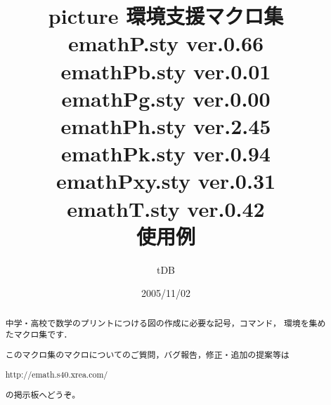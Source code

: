 \documentclass[a4j]{jarticle}
\begin{document}
\title{picture 環境支援マクロ集\\
emathP.sty {\normalsize ver.0.66}\\
emathPb.sty {\normalsize ver.0.01}\\
emathPg.sty {\normalsize ver.0.00}\\
emathPh.sty {\normalsize ver.2.45}\\
emathPk.sty {\normalsize ver.0.94}\\
emathPxy.sty {\normalsize ver.0.31}\\
emathT.sty {\normalsize ver.0.42}\\
使用例}
\author{tDB}
\date{2005/11/02}

\maketitle\thispagestyle{empty}
\begin{abstract}%
\zw%
中学・高校で数学のプリントにつける図の作成に必要な記号，コマンド，
環境を集めたマクロ集です．

このマクロ集のマクロについてのご質問，バグ報告，修正・追加の提案等は
\begin{center}
http://emath.s40.xrea.com/
\end{center}
の掲示板へどうぞ。
\end{abstract}
\pagebreak
{}%

\tableofcontents

\pagebreak











\end{document}
